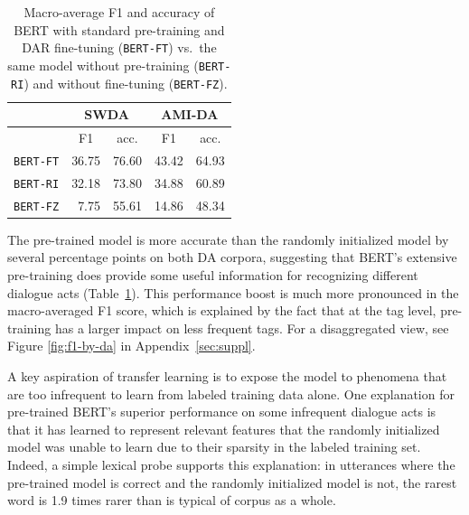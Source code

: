 \documentclass[11pt,a4paper]{article}
\begin{document}
\begin{table}[]
\centering
\begin{tabular}{@{}lrrrr@{}}
\toprule
                           & \multicolumn{2}{c}{SWDA}                          & \multicolumn{2}{c}{AMI-DA}                        \\ \midrule
                           & \multicolumn{1}{c}{F1} & \multicolumn{1}{c}{acc.} & \multicolumn{1}{c}{F1} & \multicolumn{1}{c}{acc.} \\
\texttt{BERT-FT}    & 36.75                  & 76.60                    & 43.42                  & 64.93                    \\
\texttt{BERT-RI} & 32.18           & 73.80                    & 34.88                  & 60.89                    \\ 

\texttt{BERT-FZ}    &  7.75                  & 55.61           & 14.86                  & 48.34                    \\
  \bottomrule
\end{tabular}
  \caption{Macro-average F1 and accuracy of BERT with standard pre-training and DAR fine-tuning (\texttt{BERT-FT}) vs.~the same model without pre-training (\texttt{BERT-RI}) and without fine-tuning (\texttt{BERT-FZ}).}
  \label{table:exp2}
\end{table}

The pre-trained model is more accurate than the randomly initialized model by several percentage points on both DA corpora,
suggesting that BERT's extensive pre-training does provide some useful information for recognizing different dialogue acts (Table~\ref{table:exp2}).
This performance boost is much more pronounced in the macro-averaged F1 score,
which is explained by the fact that at the tag level, pre-training has a larger impact on less frequent tags.
For a disaggregated view, see Figure \ref{fig:f1-by-da} in Appendix~\ref{sec:suppl}.

A key aspiration of transfer learning is to expose the model to phenomena that are too infrequent to learn from labeled training data alone.
One explanation for pre-trained BERT's superior performance on some infrequent dialogue acts is that it has learned to represent relevant features
that the randomly initialized model was unable to learn due to their sparsity in the labeled training set.
Indeed, a simple lexical probe supports this explanation: in utterances where the pre-trained model is correct and the randomly initialized model is not,
the rarest word is 1.9 times rarer than is typical of corpus as a whole.
\end{document}

